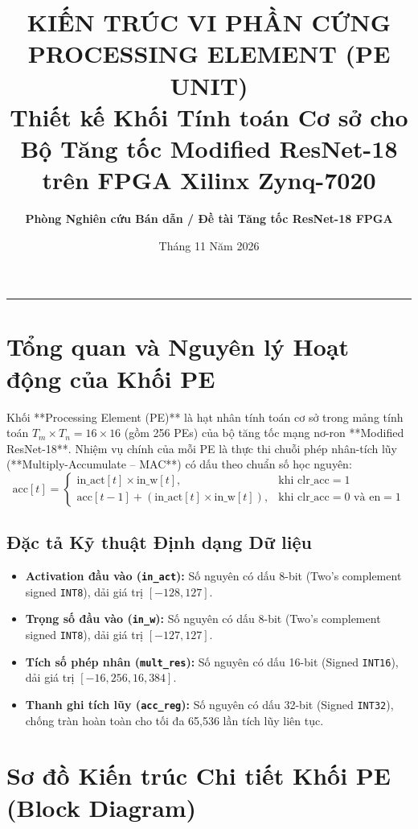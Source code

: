 \documentclass[11pt,a4paper]{article}
\title{\textbf{\Large KIẾN TRÚC VI PHẦN CỨNG PROCESSING ELEMENT (PE UNIT)}\\
\large Thiết kế Khối Tính toán Cơ sở cho Bộ Tăng tốc Modified ResNet-18 trên FPGA Xilinx Zynq-7020}
\author{\textbf{Phòng Nghiên cứu Bán dẫn / Đề tài Tăng tốc ResNet-18 FPGA}}
\date{Tháng 11 Năm 2026}
\begin{document}
\maketitle

\hrule
\vspace{0.5cm}

\section{Tổng quan và Nguyên lý Hoạt động của Khối PE}

Khối **Processing Element (PE)** là hạt nhân tính toán cơ sở trong mảng tính toán $T_m \times T_n = 16 \times 16$ (gồm 256 PEs) của bộ tăng tốc mạng nơ-ron **Modified ResNet-18**. Nhiệm vụ chính của mỗi PE là thực thi chuỗi phép nhân-tích lũy (**Multiply-Accumulate -- MAC**) có dấu theo chuẩn số học nguyên:
\begin{equation}
    \text{acc}[t] = \begin{cases}
        \text{in\_act}[t] \times \text{in\_w}[t], & \text{khi } \text{clr\_acc} = 1 \\
        \text{acc}[t-1] + (\text{in\_act}[t] \times \text{in\_w}[t]), & \text{khi } \text{clr\_acc} = 0 \text{ và } \text{en} = 1
    \end{cases}
\end{equation}

\subsection{Đặc tả Kỹ thuật Định dạng Dữ liệu}
\begin{itemize}
    \item \textbf{Activation đầu vào (\texttt{in\_act}):} Số nguyên có dấu 8-bit (Two's complement signed \texttt{INT8}), dải giá trị $[-128, 127]$.
    \item \textbf{Trọng số đầu vào (\texttt{in\_w}):} Số nguyên có dấu 8-bit (Two's complement signed \texttt{INT8}), dải giá trị $[-127, 127]$.
    \item \textbf{Tích số phép nhân (\texttt{mult\_res}):} Số nguyên có dấu 16-bit (Signed \texttt{INT16}), dải giá trị $[-16,256, 16,384]$.
    \item \textbf{Thanh ghi tích lũy (\texttt{acc\_reg}):} Số nguyên có dấu 32-bit (Signed \texttt{INT32}), chống tràn hoàn toàn cho tối đa 65,536 lần tích lũy liên tục.
\end{itemize}

\vspace{0.5cm}
\section{Sơ đồ Kiến trúc Chi tiết Khối PE (Block Diagram)}
\end{document}
